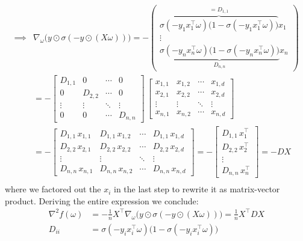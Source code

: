 \documentclass{article}
\begin{document}
\begin{align*}
\implies &\nabla_\omega \big(y \odot \sigma(-y \odot (X\omega))\big) = -
\begin{pmatrix}
 \overbrace{\sigma(-y_1 x_1^\top \omega) \big(1 - \sigma(-y_1 x_1^\top \omega)\big)}^{=D_{1,1}} x_1 \\
 \vdots \\
 \underbrace{ \sigma(-y_n x_n^\top \omega) \big(1 - \sigma(-y_n x_n^\top \omega)\big)}_{D_{n,n}} x_n
\end{pmatrix}\\
&= -
\begin{bmatrix}
D_{1,1} & 0       & \cdots & 0       \\
0       & D_{2,2} & \cdots & 0       \\
\vdots  & \vdots  & \ddots & \vdots  \\
0       & 0       & \cdots & D_{n,n}
\end{bmatrix}
\,
\begin{bmatrix}
x_{1,1} & x_{1,2} & \cdots & x_{1,d} \\
x_{2,1} & x_{2,2} & \cdots & x_{2,d} \\
\vdots  & \vdots  & \ddots & \vdots  \\
x_{n,1} & x_{n,2} & \cdots & x_{n,d}
\end{bmatrix} \\
&= -
\begin{bmatrix}
D_{1,1}\,x_{1,1} & D_{1,1}\,x_{1,2} & \cdots & D_{1,1}\,x_{1,d} \\
D_{2,2}\,x_{2,1} & D_{2,2}\,x_{2,2} & \cdots & D_{2,2}\,x_{2,d} \\
\vdots           & \vdots           & \ddots & \vdots           \\
D_{n,n}\,x_{n,1} & D_{n,n}\,x_{n,2} & \cdots & D_{n,n}\,x_{n,d}
\end{bmatrix}
= -
\begin{bmatrix}
D_{1,1}\,x_1^\top \\
D_{2,2}\,x_2^\top \\
\vdots           \\
D_{n,n}\,x_n^\top
\end{bmatrix}
= - D X\\
\end{align*}
where we factored out the $x_i$ in the last step to rewrite it as matrix-vector product. Deriving the entire expression we conclude:
\begin{align*}
\nabla ^2 f(\omega) &= -\frac{1}{n} X^\top \nabla_\omega \big(y \odot \sigma(-y \odot (X\omega))\big) = \frac{1}{n} X^\top D X \\
D_{ii} &= \sigma(-y_i x_i^\top \omega)\big(1 - \sigma(-y_i x_i^\top \omega)\big) \quad
\end{align*}
\end{document}
